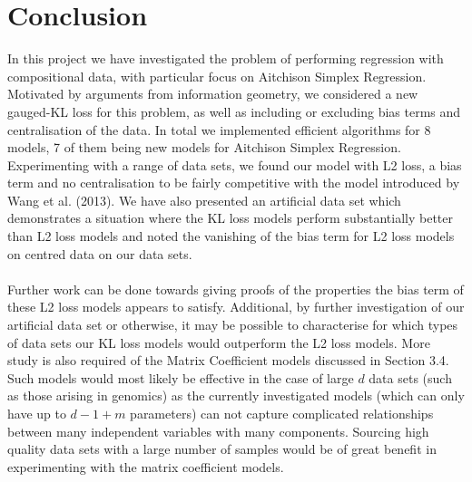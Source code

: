\documentclass[BSc]{usydthesis}
\numberwithin{equation}{chapter}
\theoremstyle{remark}
\begin{document}
\chapter{Conclusion}
In this project we have investigated the problem of performing regression with compositional data, with particular focus on Aitchison Simplex Regression. Motivated by arguments from information geometry, we considered a new gauged-KL loss for this problem, as well as including or excluding bias terms and centralisation of the data. In total we implemented efficient algorithms for 8 models, 7 of them being new models for Aitchison Simplex Regression. Experimenting with a range of data sets, we found our model with L2 loss, a bias term and no centralisation to be fairly competitive with the model introduced by Wang et al. (2013). We have also presented an artificial data set which demonstrates a situation where the KL loss models perform substantially better than L2 loss models and noted the vanishing of the bias term for L2 loss models on centred data on our data sets. \\
\\
Further work can be done towards giving proofs of the properties the bias term of these L2 loss models appears to satisfy. Additional, by further investigation of our artificial data set or otherwise, it may be possible to characterise for which types of data sets our KL loss models would outperform the L2 loss models. More study is also required of the Matrix Coefficient models discussed in Section 3.4. Such models would most likely be effective in the case of large $d$ data sets (such as those arising in genomics) as the currently investigated models (which can only have up to $d-1+m$ parameters) can not capture complicated relationships between many independent variables with many components. Sourcing high quality data sets with a large number of samples would be of great benefit in experimenting with the matrix coefficient models.
\end{document}
